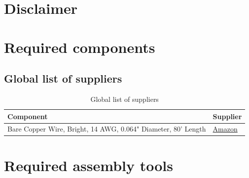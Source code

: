 \documentclass[
a4paper,     %
 headsepline, %
 footsepline, %
 titlepage,   %
 fleqn,       %
12pt         %
]{scrartcl}  %
\begin{document}


\newpage

\section{Disclaimer}
\label{sec:disclaimer}

\section{Required components}
\label{sec:required-components}

\subsection{Global list of suppliers}
\label{sec:global-list-of-suppliers}

\begin{table}[h]
\begin{center}
    \begin{tabular}{ | l | l |} \hline
    Component & Supplier \\ \hline
    Bare Copper Wire, Bright, 14 AWG, 0.064" Diameter, 80' Length  &  
    \href{http://www.amazon.com/Copper-Bright-0-064-Diameter-Length/dp/B000IJYRDE/ref=sr_1_15?ie=UTF8&qid=1446585445&sr=8-15&keywords=awg+14+copper}{Amazon}  \\ \hline

    \end{tabular}
    \caption{Global list of suppliers}
	\label{table:global-list-suppliers}
\end{center}
\end{table}

\section{Required assembly tools}
\label{sec:required-assembly-tools}
\end{document}
